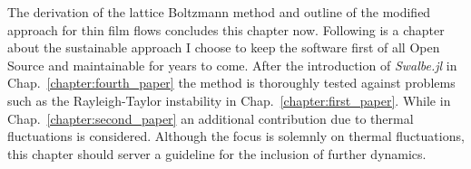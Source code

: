 The derivation of the lattice Boltzmann method and outline of the modified approach for thin film flows concludes this chapter now.
Following is a chapter about the sustainable approach I choose to keep the software first of all Open Source and maintainable for years to come.
After the introduction of \textit{Swalbe.jl} in Chap.~\ref{chapter:fourth_paper} the method is thoroughly tested against problems such as the Rayleigh-Taylor instability in Chap.~\ref{chapter:first_paper}.
While in Chap.~\ref{chapter:second_paper} an additional contribution due to thermal fluctuations is considered. 
Although the focus is solemnly on thermal fluctuations, this chapter should server a guideline for the inclusion of further dynamics.
